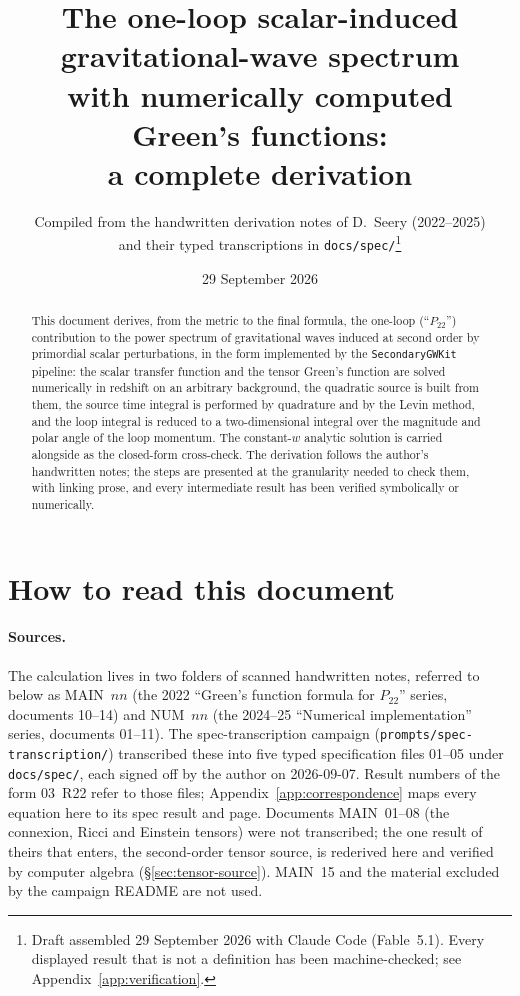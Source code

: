 \documentclass[11pt,a4paper]{article}
\title{The one-loop scalar-induced gravitational-wave spectrum\\ with numerically computed Green's functions:\\ a complete derivation}
\author{Compiled from the handwritten derivation notes of D.~Seery (2022--2025)\\ and their typed transcriptions in \texttt{docs/spec/}\footnote{Draft assembled 29 September 2026 with Claude Code (Fable~5.1). Every displayed result that is not a definition has been machine-checked; see Appendix~\ref{app:verification}.}}
\date{29 September 2026}
\newcommand{\spec}[1]{\textsf{#1}}
\newcommand{\note}[1]{\textsf{#1}}
\theoremstyle{remark}
\begin{document}
\maketitle

\begin{abstract}
\noindent
This document derives, from the metric to the final formula, the one-loop (``$P_{22}$'') contribution to the power spectrum of gravitational waves induced at second order by primordial scalar perturbations, in the form implemented by the \texttt{SecondaryGWKit} pipeline: the scalar transfer function and the tensor Green's function are solved numerically in redshift on an arbitrary background, the quadratic source is built from them, the source time integral is performed by quadrature and by the Levin method, and the loop integral is reduced to a two-dimensional integral over the magnitude and polar angle of the loop momentum. The constant-$w$ analytic solution is carried alongside as the closed-form cross-check. The derivation follows the author's handwritten notes; the steps are presented at the granularity needed to check them, with linking prose, and every intermediate result has been verified symbolically or numerically.
\end{abstract}

\tableofcontents

\section*{How to read this document}

\paragraph{Sources.} The calculation lives in two folders of scanned handwritten notes, referred to below as \note{MAIN}~$nn$ (the 2022 ``Green's function formula for $P_{22}$'' series, documents 10--14) and \note{NUM}~$nn$ (the 2024--25 ``Numerical implementation'' series, documents 01--11). The spec-transcription campaign (\texttt{prompts/spec-transcription/}) transcribed these into five typed specification files \spec{01}--\spec{05} under \texttt{docs/spec/}, each signed off by the author on 2026-09-07. Result numbers of the form \spec{03~R22} refer to those files; Appendix~\ref{app:correspondence} maps every equation here to its spec result and page. Documents \note{MAIN}~01--08 (the connexion, Ricci and Einstein tensors) were not transcribed; the one result of theirs that enters, the second-order tensor source, is rederived here and verified by computer algebra (\S\ref{sec:tensor-source}). \note{MAIN}~15 and the material excluded by the campaign README are not used.
\end{document}
